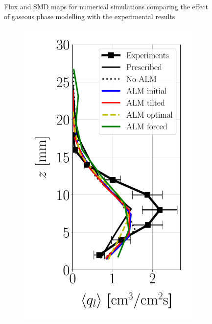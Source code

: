 \begin{figure}[h!]
\caption{Flux and SMD maps for numerical simulations comparing the effect of gaseous phase modelling with the experimental results}
\label{fig:maps_LGS_JICF_gaseous_influence}
\end{figure}














\clearpage



\begin{figure}[h!]
\flushleft
\begin{subfigure}[b]{0.2\textwidth}
	\flushleft
   \includegraphics[scale=0.35]{./part2_developments/figures_ch6_lagrangian_JICF/params_gaseous_initial_conditions/profiles/flux_along_z}

\end{subfigure}
\end{figure}
